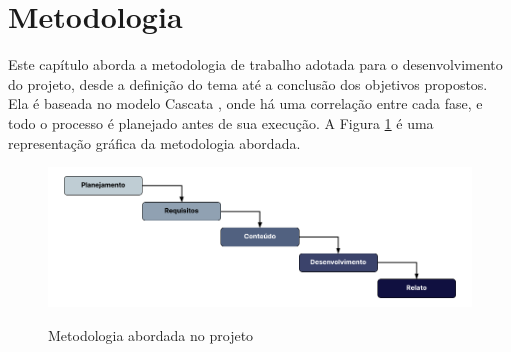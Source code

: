 \section{Metodologia}

Este capítulo aborda a metodologia de trabalho adotada para o desenvolvimento do projeto, desde a definição do tema até a conclusão dos objetivos propostos. Ela é baseada no modelo Cascata \cite{royce1987managing}, onde há uma correlação entre cada fase, e todo o processo é planejado antes de sua execução. A Figura \ref{fig:metodologia-simples} é uma representação gráfica da metodologia abordada.

\begin{figure}[H]
\centering
\caption{Metodologia abordada no projeto}
\includegraphics[width=1\textwidth]{figuras/imagens/metodologia-simples.png}
\label{fig:metodologia-simples}
\end{figure}

